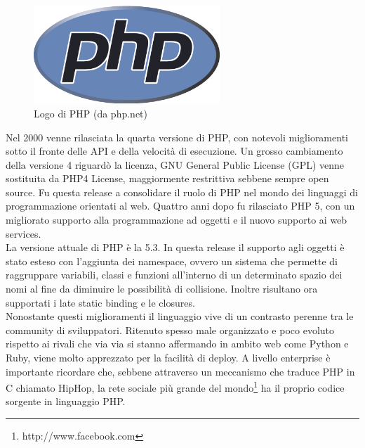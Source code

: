 \begin{figure}[!h]
\centering
\includegraphics[width=7cm]{php.png}
\caption{Logo di PHP (da php.net)}\label{php}
\end{figure}

Nel 2000 venne rilasciata la quarta versione di PHP, con notevoli miglioramenti sotto il fronte delle API e della velocità di esecuzione. Un grosso cambiamento della versione 4 riguardò la licenza, GNU General Public License (GPL) venne sostituita da PHP4 License, maggiormente restrittiva sebbene sempre open source. Fu questa release a consolidare il ruolo di PHP nel mondo dei linguaggi di programmazione orientati al web. Quattro anni dopo fu rilasciato PHP 5, con un migliorato supporto alla programmazione ad oggetti e il nuovo supporto ai web services.\\
La versione attuale di PHP è la 5.3. In questa release il supporto agli oggetti è stato esteso con l'aggiunta dei namespace, ovvero un sistema che permette di raggruppare variabili, classi e funzioni all’interno di un determinato spazio dei nomi al fine da diminuire le possibilità di collisione. Inoltre risultano ora supportati i late static binding e le closures.\\
Nonostante questi miglioramenti il linguaggio vive di un contrasto perenne tra le community di sviluppatori. Ritenuto spesso male organizzato e poco evoluto rispetto ai rivali che via via si stanno affermando in ambito web come Python e Ruby, viene molto apprezzato per la facilità di deploy. A livello enterprise è importante ricordare che, sebbene attraverso un meccanismo che traduce PHP in C chiamato HipHop\cite{hiphop}, la rete sociale più grande del mondo\footnote{http://www.facebook.com} ha il proprio codice sorgente in linguaggio PHP.

